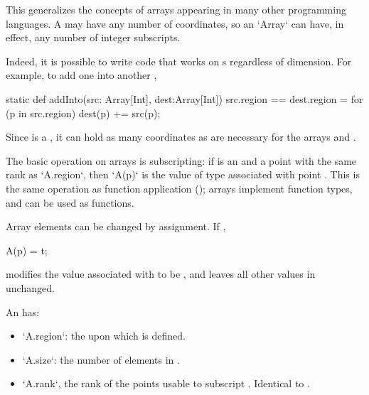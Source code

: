 This generalizes the concepts of arrays appearing in many other programming
languages.  A  may have any number of coordinates, so an
\xcd`Array` can have, in effect, any number of integer subscripts.  

\begin{ex}Indeed, it is possible to write code that works on s regardless 
of dimension.  For example, to add one   into another
, 
\begin{xten}
static def addInto(src: Array[Int], dest:Array[Int])
  {src.region == dest.region}
  = {
    for (p in src.region) 
       dest(p) += src(p);
  }
\end{xten}
\noindent
Since  is a , it can hold as many coordinates as are
necessary for the arrays  and .
\end{ex}

The basic operation on arrays is subscripting: if  is an 
and  a point with the same rank as \xcd`A.region`, then
\xcd`A(p)`
is the value of type  associated with point .
This is the same operation as function application
(); arrays implement function types, and can be
used as functions.

Array elements can be changed by assignment. If , 
\begin{xten}
A(p) = t;
\end{xten}
modifies the value associated with  to be , and leaves all other
values in  unchanged.

An   has: 
\begin{itemize}
\item \xcd`A.region`: the  upon which  is defined.
\item \xcd`A.size`: the number of elements in .
\item \xcd`A.rank`, the rank of the points usable to subscript .
      Identical to .
\end{itemize}

